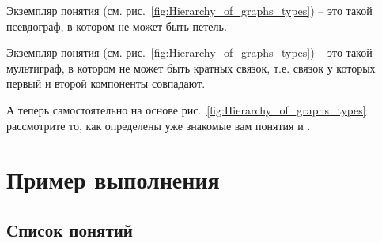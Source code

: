 Экземпляр понятия 
(см. рис.~\ref{fig:Hierarchy_of_graphs_types}) – это такой псевдограф,
в котором не может быть петель.
 
Экземпляр понятия 
(см. рис.~\ref{fig:Hierarchy_of_graphs_types}) – это такой мультиграф,
в котором не может быть кратных связок, т.е. связок у которых первый и
второй компоненты совпадают.

А теперь самостоятельно на основе
рис.~\ref{fig:Hierarchy_of_graphs_types} рассмотрите то, как
определены уже знакомые вам понятия  и
. 

\newpage

\section{Пример выполнения}
\label{sec:Onto_example}

\subsection{Список понятий}
\label{sec:Onto_ex_concepts}

